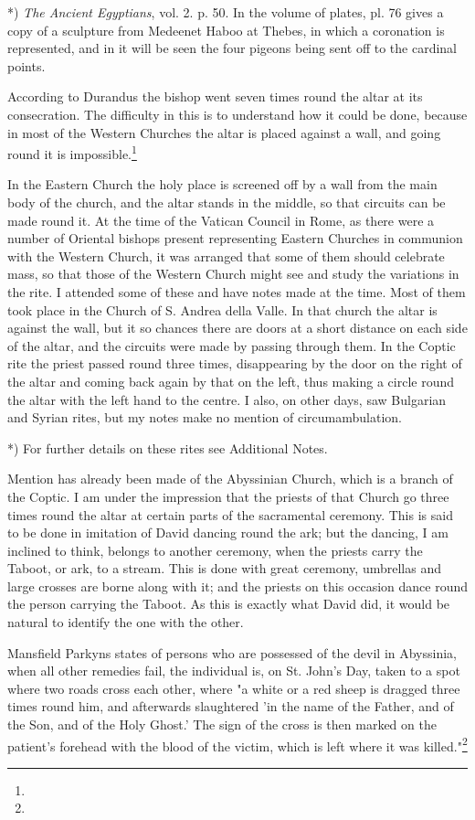 \documentclass[a4paper, 11pt, oneside, polutonikogreek, english]{article}
\begin{document}
*) \emph{The Ancient Egyptians}, vol. 2. p. 50. In the volume of plates, pl. 76 gives a copy of a sculpture from Medeenet Haboo at Thebes, in which a coronation is represented, and in it will be seen the four pigeons being sent off to the cardinal points.

According to Durandus the bishop went seven times round the altar at its consecration. The difficulty in this is to understand how it could be done, because in most of the Western Churches the altar is placed against a wall, and going round it is impossible.\footnote{}

In the Eastern Church the holy place is screened off by a wall from the main body of the church, and the altar stands in the middle, so that circuits can be made round it. At the time of the Vatican Council in Rome, as there were a number of Oriental bishops present representing Eastern Churches in communion with the Western Church, it was arranged that some of them should celebrate mass, so that those of the Western Church might see and study the variations in the rite. I attended some of these and have notes made at the time. Most of them took place in the Church of S. Andrea della Valle. In that church the altar is against the wall, but it so chances there are doors at a short distance on each side of the altar, and the circuits were made by passing through them. In the Coptic rite the priest passed round three times, disappearing by the door on the right of the altar and coming back again by that on the left, thus making a circle round the altar with the left hand to the centre. I also, on other days, saw Bulgarian and Syrian rites, but my notes make no mention of circumambulation.

*) For further details on these rites see Additional Notes.

Mention has already been made of the Abyssinian Church, which is a branch of the Coptic. I am under the impression that the priests of that Church go three times round the altar at certain parts of the sacramental ceremony. This is said to be done in imitation of David dancing round the ark; but the dancing, I am inclined to think, belongs to another ceremony, when the priests carry the Taboot, or ark, to a stream. This is done with great ceremony, umbrellas and large crosses are borne along with it; and the priests on this occasion dance round the person carrying the Taboot. As this is exactly what David did, it would be natural to identify the one with the other.

Mansfield Parkyns states of persons who are possessed of the devil in Abyssinia, when all other remedies fail, the individual is, on St. John's Day, taken to a spot where two roads cross each other, where "a white or a red sheep is dragged three times round him, and afterwards slaughtered 'in the name of the Father, and of the Son, and of the Holy Ghost.' The sign of the cross is then marked on the patient's forehead with the blood of the victim, which is left where it was killed."\footnote{}
\end{document}

